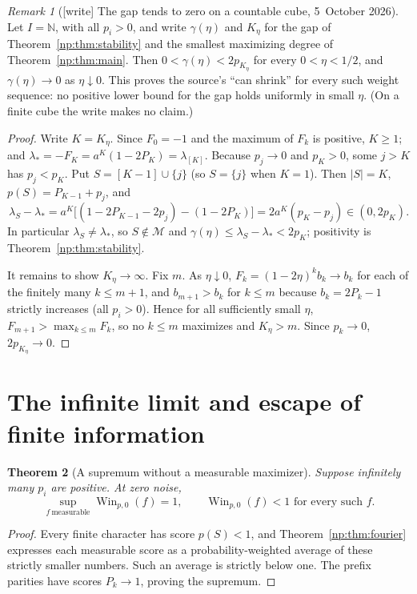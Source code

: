 \documentclass[11pt,a4paper]{article}
\newtheorem{theorem}{Theorem}[section]
\theoremstyle{definition}
\theoremstyle{remark}
\newtheorem{remark}[theorem]{Remark}
\newcommand{\N}{\mathbb N}
\newcommand{\Win}{\operatorname{Win}}
\begin{document}
\begin{remark}[{[write]} The gap tends to zero on a countable cube, 5~October 2026]
\label{np:rem:gap-shrinks}
Let \(I=\N\), with all \(p_i>0\), and write \(\gamma(\eta)\) and \(K_\eta\)
for the gap of Theorem~\ref{np:thm:stability} and the smallest maximizing
degree of Theorem~\ref{np:thm:main}. Then
\(0<\gamma(\eta)<2p_{K_\eta}\) for every \(0<\eta<1/2\), and
\(\gamma(\eta)\to0\) as \(\eta\downarrow0\). This proves the source's
``can shrink'' for every such weight sequence: no positive lower bound for
the gap holds uniformly in small \(\eta\). (On a finite cube the write
makes no claim.)
\end{remark}
\begin{proof}
Write \(K=K_\eta\). Since \(F_0=-1\) and the maximum of \(F_k\) is positive,
\(K\ge1\); and \(\lambda_*=-F_K=a^K(1-2P_K)=\lambda_{[K]}\). Because
\(p_j\to0\) and \(p_K>0\), some \(j>K\) has \(p_j<p_K\). Put
\(S=[K-1]\cup\{j\}\) (so \(S=\{j\}\) when \(K=1\)). Then \(|S|=K\),
\(p(S)=P_{K-1}+p_j\), and
\[
 \lambda_S-\lambda_*
 =a^K\bigl[(1-2P_{K-1}-2p_j)-(1-2P_K)\bigr]
 =2a^K(p_K-p_j)\in(0,2p_K).
\]
In particular \(\lambda_S\ne\lambda_*\), so \(S\notin\mathcal M\) and
\(\gamma(\eta)\le\lambda_S-\lambda_*<2p_K\); positivity is
Theorem~\ref{np:thm:stability}.

It remains to show \(K_\eta\to\infty\). Fix \(m\). As \(\eta\downarrow0\),
\(F_k=(1-2\eta)^kb_k\to b_k\) for each of the finitely many
\(k\le m+1\), and \(b_{m+1}>b_k\) for \(k\le m\) because \(b_k=2P_k-1\)
strictly increases (all \(p_i>0\)). Hence for all sufficiently small
\(\eta\), \(F_{m+1}>\max_{k\le m}F_k\), so no \(k\le m\) maximizes and
\(K_\eta>m\). Since \(p_k\to0\), \(2p_{K_\eta}\to0\).
\end{proof}

\section{The infinite limit and escape of finite information}
\label{np:sec:infinite}

\begin{theorem}[A supremum without a measurable maximizer]
\label{np:thm:zero}
Suppose infinitely many \(p_i\) are positive. At zero noise,
\[
 \sup_{f\ \mathrm{measurable}}\Win_{p,0}(f)=1,
 \qquad \Win_{p,0}(f)<1\text{ for every such }f.
\]
\end{theorem}
\begin{proof}
Every finite character has score \(p(S)<1\), and
Theorem~\ref{np:thm:fourier} expresses each measurable score as a
probability-weighted average of these strictly smaller numbers.
Such an average is strictly below one. The prefix parities have
scores \(P_k\to1\), proving the supremum.
\end{proof}
\end{document}
